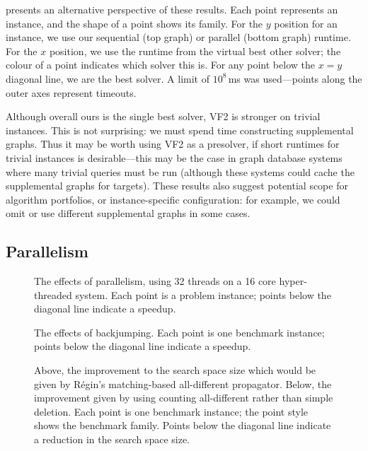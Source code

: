 \documentclass{llncs}
\begin{document}
 presents an alternative perspective of these results. Each point represents
an instance, and the shape of a point shows its family. For the $y$ position for an instance, we use
our sequential (top graph) or parallel (bottom graph) runtime. For the $x$ position, we use the
runtime from the virtual best other solver; the colour of a point indicates which solver this is.
For any point below the $x=y$ diagonal line, we are the best solver. A limit of $10^8$\,ms was
used---points along the outer axes represent timeouts.

Although overall ours is the single best solver, VF2 is stronger on trivial instances. This is not
surprising: we must spend time constructing supplemental graphs. Thus it may be worth using VF2 as a
presolver, if short runtimes for trivial instances is desirable---this may be the case in graph
database systems where many trivial queries must be run \cite{Giugno:2013} (although these systems
could cache the supplemental graphs for targets). These results also suggest potential scope for
algorithm portfolios, or instance-specific configuration: for example, we could omit or use
different supplemental graphs in some cases.

\subsection{Parallelism}

\begin{figure}[p]
    \centering
    

    \caption{The effects of parallelism, using 32 threads on a 16 core hyper-threaded
    system.  Each point is a problem instance; points below the diagonal line indicate a speedup.}
    \label{figure:speedup}
\end{figure}

\begin{figure}[p]
    \centering
    

    \caption{The effects of backjumping. Each point is one benchmark instance; points below the
    diagonal line indicate a speedup.}
    \label{figure:bj}
\end{figure}

\begin{figure}[p]
    \centering
    

    \caption{Above, the improvement to the search space size which would be given by R\'egin's
    matching-based all-different propagator. Below, the improvement given by using counting
    all-different rather than simple deletion. Each point is one benchmark instance; the point style
    shows the benchmark family. Points below the diagonal line indicate a reduction in the search space
    size.}
    \label{figure:fad}
\end{figure}
\end{document}
